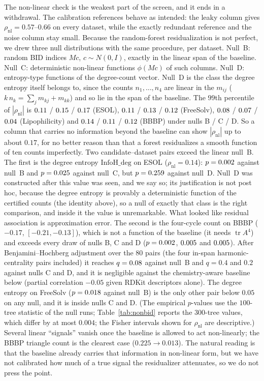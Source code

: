 \documentclass[11pt,a4paper]{article}
\theoremstyle{definition}
\begin{document}
The non-linear check is the weakest part of the screen, and it ends
in a withdrawal. The calibration references behave as intended:
the leaky column gives $\rho_{\mathrm{nl}}=0.57$--$0.66$ on every
dataset, while the exactly redundant reference and the noise column
stay small. Because the random-forest residualization is not perfect,
we drew three null distributions with the same procedure, per dataset.
Null~B: \nullKB{} random BID indices $Mc$, $c\sim N(0,I)$, exactly in
the linear span of the baseline. Null~C: \nullKC{} deterministic
non-linear functions $\phi(Mc)$ of such columns. Null~D: \nullKD{}
entropy-type functions of the degree-count vector. Null~D is the class
the degree entropy itself belongs to, since the counts $n_1,\dots,n_4$
are linear in the $m_{ij}$ ($k\,n_k=\sum_{j}m_{kj}+m_{kk}$) and so lie
in the span of the baseline. The $99$th percentile of
$|\rho_{\mathrm{nl}}|$ is $0.11$ / $0.15$ / $0.17$
(ESOL), $0.11$ / $0.13$ / $0.12$ (FreeSolv),
$0.08$ / $0.07$ / $0.04$ (Lipophilicity) and
$0.14$ / $0.11$ / $0.12$ (BBBP) under nulls B / C / D.
So a column that carries no information beyond the baseline can show
$|\rho_{\mathrm{nl}}|$ up to about $0.17$, for no better reason than
that a forest residualizes a smooth function of ten counts
imperfectly. Two candidate--dataset pairs exceed the linear null~B.
The first is the degree entropy $\mathrm{InfoH\_deg}$ on ESOL
($\rho_{\mathrm{nl}}=0.14$): $p=0.002$ against null~B and
$p=0.025$ against null~C, but $p=0.259$ against null~D.
Null~D was constructed after this value was seen, and we say so; its
justification is not post hoc, because the degree entropy is provably
a deterministic function of the certified counts (the identity above),
so a null of exactly that class is the right comparison, and inside it
the value is unremarkable. What looked like residual association is
approximation error. The second is the four-cycle count on BBBP
($-0.17$, $[-0.21,-0.13]$), which is not a function of the baseline
(it needs $\operatorname{tr}A^4$) and exceeds every draw of nulls B,
C and D ($p=0.002$, $0.005$ and $0.005$). After
Benjamini--Hochberg adjustment over the $80$ pairs (the four in-span
harmonic-centrality pairs included) it reaches $q=0.08$ against
null~B and $q=0.4$ and $0.2$ against nulls C and D, and it is negligible
against the chemistry-aware baseline below (partial correlation
$-0.05$ given RDKit descriptors alone). The degree entropy on FreeSolv
($p=0.018$ against null~B) is the only other pair below $0.05$
on any null, and it is inside nulls C and D. (The
empirical $p$-values use the $100$-tree statistic of the null runs;
Table~\ref{tab:nonbid} reports the $300$-tree values, which differ by at
most $0.004$; the Fisher intervals shown for $\rho_{\mathrm{nl}}$ are
descriptive.) Several linear ``signals'' vanish once the baseline is
allowed to act non-linearly; the BBBP triangle count is the clearest
case ($0.225\to0.013$). The natural reading is that the baseline
already carries that information in non-linear form, but we have not
calibrated how much of a true signal the residualizer attenuates, so
we do not press the point.
\end{document}
